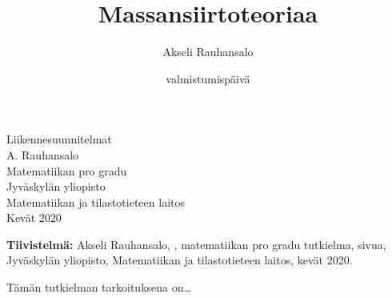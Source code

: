 
\title{Massansiirtoteoriaa}
\author{Akseli Rauhansalo}
\date{valmistumispäivä}


\thispagestyle{empty}                   %
\begin{center}                          %
\null\vspace{3cm}                       %
\Large                                  %
Liikennesuunnitelmat\\[2cm]                     %
\large                                  %
A. Rauhansalo\\[1cm]                    %
\vfill                                  %
\normalsize                             %
Matematiikan pro gradu\\[1cm]           %
Jyväskylän yliopisto\\                  %
Matematiikan ja tilastotieteen laitos\\ %
Kevät 2020                              %
\end{center}                            %
\frontmatter

\noindent
\textbf{Tiivistelmä:} Akseli Rauhansalo, , matematiikan pro gradu tutkielma,  sivua, Jyväskylän yliopisto, Matematiikan ja tilastotieteen laitos, kevät 2020.

\vspace{1pc}
Tämän tutkielman tarkoituksena on\dots


\newpage
\setcounter{tocdepth}{2}
\thispagestyle{empty}
\tableofcontents

\thispagestyle{empty}
\mainmatter


